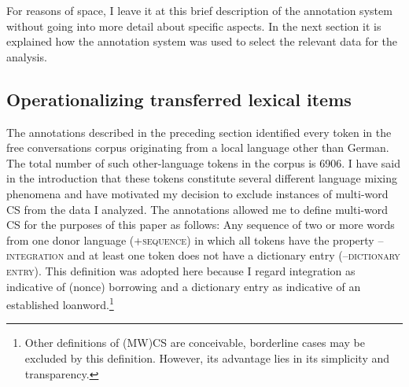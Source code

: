 \documentclass[output=paper]{langsci/langscibook}
\begin{document}
For reasons of space, I leave it at this brief description of the annotation system without going into more detail about specific aspects. In the next section it is explained how the annotation system was used to select the relevant data for the analysis.

 
   
  
\subsection{Operationalizing transferred lexical items}
\label{sec:bracke:4.3}


The annotations described in the preceding section identified every token in the free conversations corpus originating from a local language other than German. The total number of such other-language tokens in the corpus is 6906. I have said in the introduction that these tokens constitute several different language mixing phenomena and have motivated my decision to exclude instances of multi-word CS from the data I analyzed. The annotations allowed me to define multi-word CS for the purposes of this paper as follows: Any sequence of two or more words from one donor language (+\textsc{sequence}) in which all tokens have the property \textsc{–integration} and at least one token does not have a dictionary entry (–⁠\textsc{dictionary} \textsc{entry).} This definition was adopted here because I regard integration as indicative of (nonce) borrowing and a dictionary entry as indicative of an established loanword.\footnote{Other definitions of (MW)CS are conceivable, borderline cases may be excluded by this definition. However, its advantage lies in its simplicity and transparency.}
\end{document}
